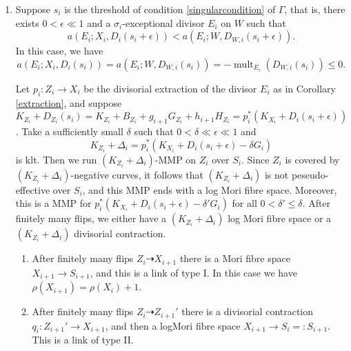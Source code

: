 \documentclass{article}
\begin{document}
\begin{enumerate}
\begin{enumerate}
  \end{enumerate}
\item\label{2b} Suppose $s_{i}$ is the threshold of condition \ref{singularcondition} of $\Gamma$, that is, there exists  $0<\epsilon \ll 1$ and a $\sigma_{i}$-exceptional divisor $E_{i}$ on $W$ such that 
    \[
      a(E_{i};X_{i},D_{i}(s_{i}+\epsilon))< a(E_{i};W,D_{W,i}(s_{i}+\epsilon))
    .\]
   In this case, we have 
    \[
  a(E_{i};X_{i},D_{i}(s_{i}))= a(E_{i};W,D_{W,i}(s_{i}))=-\operatorname{mult}_{E_{i}}(D_{W,i}(s_{i}))\leqslant 0
    .\]

    Let $p_{i}:Z_{i}\to X_{i}$ be the divisorial extraction of the divisor $E_{i}$ as in Corollary \ref{extraction}, and suppose $K_{Z_{i}}+D_{Z_{i}}(s_{i})=K_{Z_{i}}+B_{Z_{i}}+g_{i+1}G_{Z_{i}}+h_{i+1}H_{Z_{i}}=p_{i}^*\left(K_{X_{i}}+D_{i}\left(s_{i}+\epsilon\right)\right)$.
   Take a sufficiently small $\delta$ such that $0<\delta \ll \epsilon \ll 1$ and
   \[
     K_{Z_{i}}+\Delta_{i}=p_{i}^*(K_{X_{i}}+D_{i}(s_{i}+\epsilon)-\delta G_{i})
   \]
  is klt. Then we run $(K_{Z_{i}}+\Delta_{i})$-MMP on $Z_{i}$ over $S_{i}$. Since $Z_{i}$ is covered by $(K_{Z_{i}}+\Delta_{i})$-negative curves, it follows that $(K_{Z_{i}}+\Delta_{i})$ is not peseudo-effective over $S_{i}$, and  this MMP ends with a log Mori fibre space. Moreover, this is a MMP for $p_{i}^*(K_{X_{i}}+D_{i}(s_{i}+\epsilon)-\delta'G_{i})$ for all $0<\delta'\leqslant\delta$. After finitely many flips, we either have a $(K_{Z_{i}}+\Delta_{i})$ log Mori fibre space or a $(K_{Z_{i}}+\Delta_{i})$ divisorial contraction.
  \begin{enumerate}
    \item\label{2b1} After finitely many flips $Z_{i}\dashrightarrow X_{i+1}$ there is a Mori fibre space $X_{i+1}\to S_{i+1}$, and this is a link of type I. In this case we have $\rho(X_{i+1})=\rho(X_{i})+1$.
    \item\label{2b2} After finitely many flips $Z_{i}\dashrightarrow Z_{i+1}'$ there is a divisorial contraction $q_{i}:Z_{i+1}'\to X_{i+1}$, and then a logMori fibre space $X_{i+1}\to S_{i}=:S_{i+1}$. This is a link of type II.
  \end{enumerate}
\end{enumerate}
\end{document}
